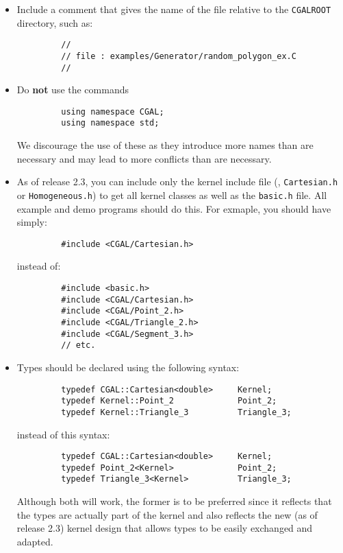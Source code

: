 \begin{itemize}
   \item Include a comment that gives the name of the file relative to
         the \texttt{CGALROOT} directory, such as:
         \begin{verbatim}
         //
         // file : examples/Generator/random_polygon_ex.C
         //
         \end{verbatim} 
   \item Do \textbf{not} use the commands 
         \begin{verbatim}
         using namespace CGAL;
         using namespace std;
         \end{verbatim}
         We discourage the use of these as they introduce more names than
         are necessary and may lead to more conflicts than are necessary.
   \item As of release 2.3, you can include only the kernel include file
         (\eg, \texttt{Cartesian.h} or \texttt{Homogeneous.h}) to get all
         kernel classes as well as the \texttt{basic.h} file.  All example
         and demo programs should do this.  For exmaple, you should have
         simply:
         \begin{verbatim}
         #include <CGAL/Cartesian.h>
         \end{verbatim}
         instead of:
         \begin{verbatim}
         #include <basic.h>
         #include <CGAL/Cartesian.h>
         #include <CGAL/Point_2.h>
         #include <CGAL/Triangle_2.h>
         #include <CGAL/Segment_3.h>
         // etc.
         \end{verbatim}
   \item Types should be declared using the following syntax:
         \begin{verbatim}
         typedef CGAL::Cartesian<double>     Kernel;
         typedef Kernel::Point_2             Point_2;
         typedef Kernel::Triangle_3          Triangle_3;
         \end{verbatim}
         instead of this syntax:
         \begin{verbatim}
         typedef CGAL::Cartesian<double>     Kernel;
         typedef Point_2<Kernel>             Point_2;
         typedef Triangle_3<Kernel>          Triangle_3;
         \end{verbatim}
         Although both will work, the former is to be preferred since
         it reflects that the types are actually part of the kernel and
         also reflects the new (as of release 2.3) kernel design that allows
         types to be easily exchanged and adapted.  
    

\end{itemize}
